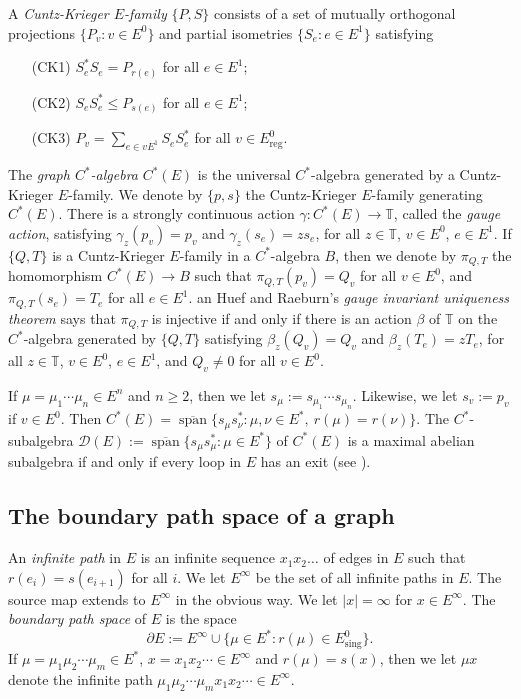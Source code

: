 \documentclass[12pt, a4paper]{amsart}
\numberwithin{equation}{section}
\theoremstyle{definition}
\theoremstyle{remark}
\begin{document}
A {\em Cuntz-Krieger $E$-family} $\{P,S\}$ consists of a set of mutually orthogonal projections $\{P_v:v\in E^0\}$ and partial isometries $\{S_e:e\in E^1\}$ satisfying
\begin{enumerate}
\item[(CK1)] $S_e^*S_e=P_{r(e)}$ for all $e\in E^1$;
\item[(CK2)] $S_eS_e^*\le P_{s(e)}$ for all $e\in E^1$;
\item[(CK3)] $\displaystyle{P_v=\sum_{e\in vE^1}S_eS_e^*}$ for all $v\in E^0_{{\operatorname{reg}}}$.
\end{enumerate}
The {\em graph $C^*$-algebra} $C^*(E)$ is the universal $C^*$-algebra generated by a Cuntz-Krieger $E$-family. We denote by $\{p,s\}$ the Cuntz-Krieger $E$-family generating $C^*(E)$. There is a strongly continuous action $\gamma:C^*(E)\to{\mathbb{T}}$, called the {\em gauge action}, satisfying $\gamma_z(p_v)=p_v$ and $\gamma_z(s_e)=zs_e$, for all $z\in {\mathbb{T}}$, $v\in E^0$, $e\in E^1$. If $\{Q,T\}$ is a Cuntz-Krieger $E$-family in a $C^*$-algebra $B$, then we denote by $\pi_{Q,T}$ the homomorphism $C^*(E)\to B$ such that $\pi_{Q,T}(p_v)=Q_v$ for all $v\in E^0$, and $\pi_{Q,T}(s_e)=T_e$ for all $e\in E^1$. an Huef and Raeburn's \emph{gauge invariant uniqueness theorem} \cite{aHR} says that $\pi_{Q,T}$ is injective if and only if there is an action $\beta$ of ${\mathbb{T}}$ on the $C^*$-algebra generated by $\{Q,T\}$ satisfying $\beta_z(Q_v)=Q_v$ and $\beta_z(T_e)=zT_e$, for all $z\in {\mathbb{T}}$, $v\in E^0$, $e\in E^1$, and $Q_v\ne 0$ for all $v\in E^0$.

If $\mu=\mu_1\cdots\mu_n\in E^n$ and $n\ge 2$, then we let $s_\mu:=s_{\mu_1}\cdots s_{\mu_n}$. Likewise, we let $s_v:=p_v$ if $v\in E^0$. Then $C^*(E)={\overline{\operatorname{span}}}\{s_\mu s_\nu^*:\mu,\nu\in E^*,\ r(\mu)=r(\nu)\}$. The $C^*$-subalgebra ${\mathcal{D}}(E):={\overline{\operatorname{span}}}\{s_\mu s_\mu^*:\mu\in E^*\}$ of $C^*(E)$ is a maximal abelian subalgebra if and only if every loop in $E$ has an exit (see \cite[Example 3.3]{NR}).

\subsection{The boundary path space of a graph}

An \emph{infinite path} in $E$ is an infinite sequence $x_1x_2\dots $ of edges in $E$ such that $r(e_i)=s(e_{i+1})$ for all $i$. We let $E^\infty$ be the set of all infinite paths in $E$. The source map extends to $E^\infty$ in the obvious way. We let $|x|=\infty$ for $x\in E^\infty$. The \emph{boundary path space} of $E$ is the space 
\begin{equation*}
	\partial E:=E^\infty\cup\{\mu\in E^*:r(\mu)\in E^0_{{\operatorname{sing}}}\}.
\end{equation*} 
If $\mu=\mu_1\mu_2\cdots\mu_m\in E^*$, $x=x_1x_2\cdots\in E^\infty$ and $r(\mu)=s(x)$, then we let $\mu x$ denote the infinite path  $\mu_1\mu_2\cdots\mu_m x_1x_2\cdots \in E^\infty$.
\end{document}
